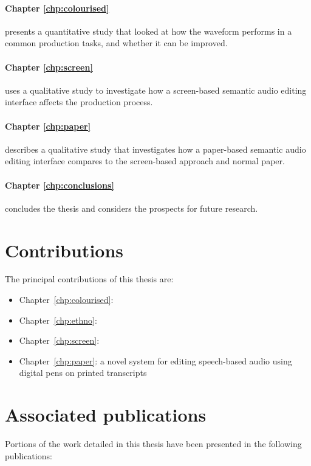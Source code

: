 \paragraph{Chapter \ref{chp:colourised}} presents a quantitative study that looked at how the waveform performs in a
common production tasks, and whether it can be improved.

\paragraph{Chapter \ref{chp:screen}} uses a qualitative study to investigate how a screen-based semantic audio editing
interface affects the production process.

\paragraph{Chapter \ref{chp:paper}} describes a qualitative study that investigates how a paper-based semantic audio
editing interface compares to the screen-based approach and normal paper.

\paragraph{Chapter \ref{chp:conclusions}} concludes the thesis and considers the prospects for future research.

\section{Contributions}\label{sec:intro-contributions}

The principal contributions of this thesis are:
\begin{itemize}
  \item Chapter~\ref{chp:colourised}: 
  \item Chapter~\ref{chp:ethno}: 
  \item Chapter~\ref{chp:screen}: 
  \item Chapter~\ref{chp:paper}: a novel system for editing speech-based audio using digital pens on printed transcripts
\end{itemize}

\section{Associated publications}\label{sec:intro-publications}

Portions of the work detailed in this thesis have been presented in the following publications:

